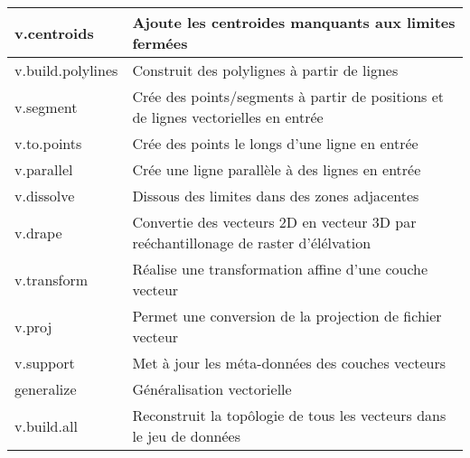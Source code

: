 \begin{table}[H]
{\begin{longtable}{|p{2.5cm}|p{11.5cm}|}
  \hline v.centroids & Ajoute les centroides manquants aux limites fermées\\
  \hline v.build.polylines & Construit des polylignes à partir de lignes\\
  \hline v.segment & Crée des points/segments à partir de positions et de lignes vectorielles en entrée\\
  \hline v.to.points & Crée des points le longs d'une ligne en entrée\\
  \hline v.parallel & Crée une ligne parallèle à des lignes en entrée\\
  \hline v.dissolve & Dissous des limites dans des zones adjacentes\\
  \hline v.drape & Convertie des vecteurs 2D en vecteur 3D par reéchantillonage de raster d'élélvation\\
  \hline v.transform & Réalise une transformation affine d'une couche vecteur\\
  \hline v.proj & Permet une conversion de la projection de fichier vecteur\\
  \hline v.support & Met à jour les méta-données des couches vecteurs\\
  \hline generalize & Généralisation vectorielle\\
  \hline v.build.all & Reconstruit la top\^ologie de tous les vecteurs dans le jeu de données\\

\end{longtable}}
\end{table}
